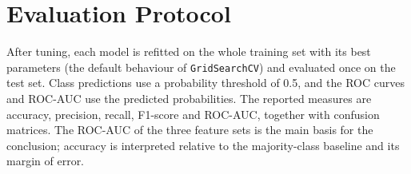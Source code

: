 \section{Evaluation Protocol}
After tuning, each model is refitted on the whole training set with its best parameters (the default behaviour of \texttt{GridSearchCV}) and evaluated once on the test set. Class predictions use a probability threshold of 0.5, and the ROC curves and ROC-AUC use the predicted probabilities. The reported measures are accuracy, precision, recall, F1-score and ROC-AUC, together with confusion matrices. The ROC-AUC of the three feature sets is the main basis for the conclusion; accuracy is interpreted relative to the majority-class baseline and its margin of error.
